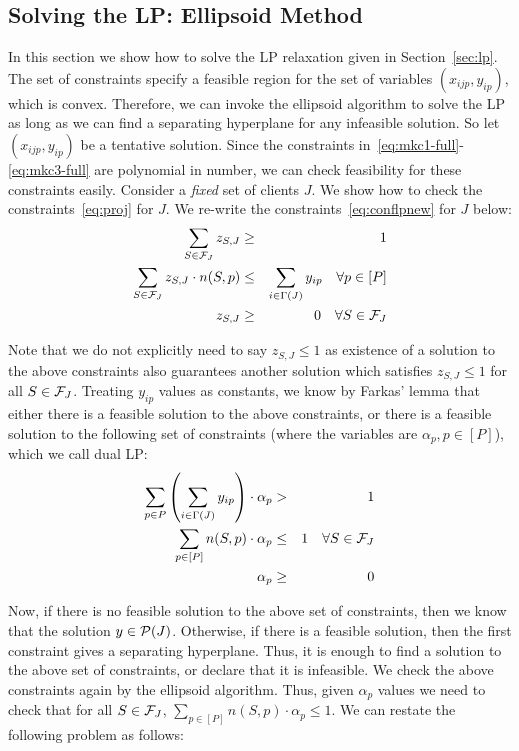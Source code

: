 \subsection{Solving the LP: Ellipsoid Method}
\label{sec:ellipsoid}
In this section we show how to solve the LP relaxation given in Section~\ref{sec:lp}. The set of constraints specify a feasible region for the set of variables $(x_{ijp}, y_{ip})$, which is convex. Therefore, we can invoke the ellipsoid algorithm to solve the LP as long as we can find a separating hyperplane for any infeasible solution. So let $(x_{ijp}, y_{ip})$ be a tentative solution. Since the  constraints in~\eqref{eq:mkc1-full}-\eqref{eq:mkc3-full} are polynomial in number, we can check feasibility for these constraints easily. Consider a {\em fixed} set  of clients $J$.
We show how to check the constraints~\eqref{eq:proj} for $J$. We re-write the constraints~\eqref{eq:conflpnew} for $J$ below:
\begin{eqnarray*}
\sum_{S \in {\cal F}_J} z_{S,J} & \geq & 1 \\
\sum_{S\in {\cal F}_{J}} z_{S,J}\cdot n(S,p) &\leq  & \sum_{i\in \Gamma(J)} y_{ip}  \ \ \ \forall p \in [P] \\
z_{S,J} & \geq &  0 \ \ \ \forall S \in {\cal F}_J
\end{eqnarray*}

Note that we do not explicitly need to say $z_{S,J} \leq 1$ as existence of a solution to the above constraints also guarantees another solution
which satisfies $z_{S,J} \leq 1$ for all $S \in {\cal F}_J$. Treating $y_{ip}$ values as constants, we know by Farkas' lemma that either there is a feasible solution to
the above constraints, or there is a feasible solution to the following set of constraints (where the variables are $\alpha_p, p \in [P]$),
which we call dual LP:
 \begin{eqnarray}
\sum_{p \in P} \left( \sum_{i \in \Gamma(J)} y_{ip} \right) \cdot  \alpha_p & > & 1 \\
\label{eq:ellipsoid1}
 \sum_{p \in [P]} n(S,p) \cdot \alpha_p & \leq & 1 \ \ \ \forall S \in {\cal F}_J \\
 \label{eq:ellipsoid2}
\alpha_p & \geq & 0
\end{eqnarray}

Now, if there is no feasible solution to the above set of constraints, then we know that the solution $y \in {\cal P}(J)$. Otherwise, if there is a
feasible solution, then the first constraint  gives a separating hyperplane. Thus, it is enough to find a solution to the above set of constraints, or
declare that it is infeasible. We check the above constraints again by the ellipsoid algorithm. Thus, given $\alpha_p$ values we need to check that
for all $S \in {\cal F}_J$, $\sum_{p \in [P]} n(S,p) \cdot \alpha_p \leq 1$. We can restate the following problem as follows: 

